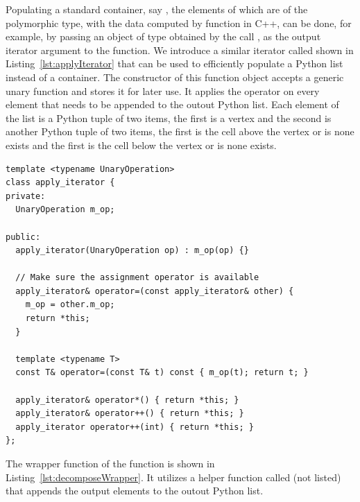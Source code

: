 Populating a standard container, say , the
elements of which are of the 
polymorphic type, with the data computed by
 function in C++, can be done, for
example, by passing an object of type
 obtained by
the call , as the output
iterator argument to the function. We introduce a similar iterator
called  shown in
Listing~\ref{lst:applyIterator} that can be used to efficiently
populate a Python list instead of a container. The constructor of this
function object accepts a generic unary function and stores it for
later use. It applies the operator on every element that needs to be
appended to the outout Python list. Each element of the list is a
Python tuple of two items, the first is a vertex and the second is
another Python tuple of two items, the first is the cell above the
vertex or  is none exists and the first is the
cell below the vertex or  is none exists.

\begin{lstfloat}
  \begin{lstlisting}[style=cppFramedStyle,basicstyle=\normalsize,%
                     label={lst:applyIterator},%
                     caption={An output iterator that applies an operation on
                       every output element.}]
template <typename UnaryOperation>
class apply_iterator {
private:
  UnaryOperation m_op;

public:
  apply_iterator(UnaryOperation op) : m_op(op) {}

  // Make sure the assignment operator is available
  apply_iterator& operator=(const apply_iterator& other) {
    m_op = other.m_op;
    return *this;
  }

  template <typename T>
  const T& operator=(const T& t) const { m_op(t); return t; }

  apply_iterator& operator*() { return *this; }
  apply_iterator& operator++() { return *this; }
  apply_iterator operator++(int) { return *this; }
};
  \end{lstlisting}
\end{lstfloat}

The wrapper function of the  function
is shown in Listing~\ref{lst:decomposeWrapper}. It utilizes a helper
function called  (not listed) that
appends the output elements to the outout Python list.

